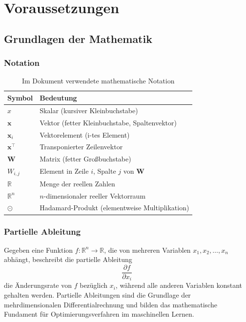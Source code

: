 \chapter{Voraussetzungen}

\section{Grundlagen der Mathematik}

\subsection{Notation}

\begin{table}[h!]
    \centering
    \begin{tabularx}{\textwidth}{lX}
        \textbf{Symbol} & \textbf{Bedeutung} \\\toprule
        $x$                        & Skalar (kursiver Kleinbuchstabe) \\
        $\mathbf{x}$               & Vektor (fetter Kleinbuchstabe, Spaltenvektor) \\
        $\mathbf{x}_{i}$             & Vektorelement (i-tes Element) \\
        $\mathbf{x}^\top$          & Transponierter Zeilenvektor \\
        $\mathbf{W}$               & Matrix (fetter Großbuchstabe) \\
        $W_{i,j}$                   & Element in Zeile $i$, Spalte $j$ von $\mathbf{W}$ \\
        $\mathbb{R}$               & Menge der reellen Zahlen \\
        $\mathbb{R}^n$             & $n$-dimensionaler reeller Vektorraum \\
        $\odot$                    & Hadamard-Produkt (elementweise Multiplikation) \\\bottomrule
    \end{tabularx}
    \caption{Im Dokument verwendete mathematische Notation}
    \label{tab:notation}
\end{table}

\subsection{Partielle Ableitung}

Gegeben eine Funktion $f : \mathbb{R}^n \to \mathbb{R}$, die von mehreren Variablen
$x_1, x_2, \ldots, x_n$ abhängt, beschreibt die partielle Ableitung
\begin{equation}
    \frac{\partial f}{\partial x_i}
\end{equation}
die Änderungsrate von $f$ bezüglich $x_i$, während alle anderen Variablen konstant gehalten werden.
Partielle Ableitungen sind die Grundlage der mehrdimensionalen Differentialrechnung und bilden
das mathematische Fundament für Optimierungsverfahren im maschinellen Lernen.

